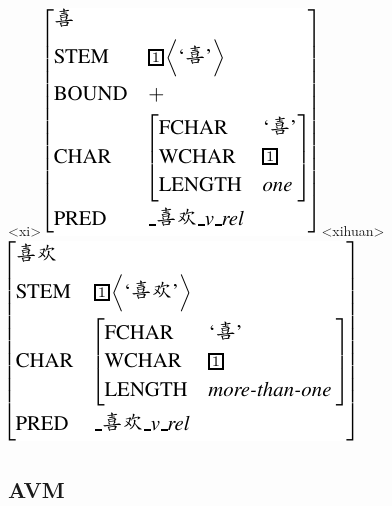 \documentclass[11pt]{article}
\begin{document}
{\small 
{}
\a<xi>
\vspace{-10pt}
\newline
\includegraphics[scale=.8]{pdf/xi.pdf}
\a<xihuan>
\vspace{-10pt}
\newline
\includegraphics[scale=.8]{pdf/xihuan.pdf}
\xe}
\vspace{-20pt}



\subsection{AVM}
\label{ssec:avm}
\end{document}
